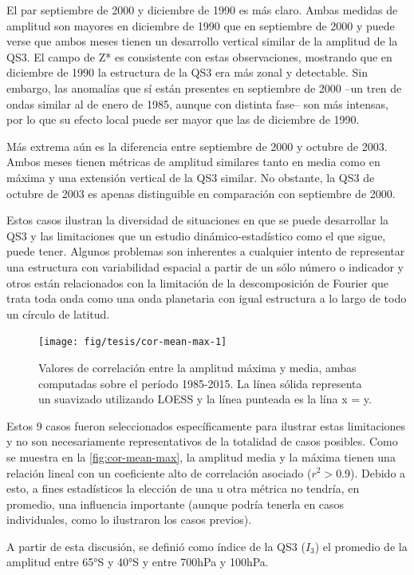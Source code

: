 \documentclass[spanish,a4paper,12pt,oneside]{book}
\begin{document}
El par septiembre de 2000 y diciembre de 1990 es más claro. Ambas
medidas de amplitud son mayores en diciembre de 1990 que en septiembre
de 2000 y puede verse que ambos meses tienen un desarrollo vertical
similar de la amplitud de la QS3. El campo de Z* es consistente con
estas observaciones, mostrando que en diciembre de 1990 la estructura de
la QS3 era más zonal y detectable. Sin embargo, las anomalías que sí
están presentes en septiembre de 2000 --un tren de ondas similar al de
enero de 1985, aunque con distinta fase-- son más intensas, por lo que
su efecto local puede ser mayor que las de diciembre de 1990.

Más extrema aún es la diferencia entre septiembre de 2000 y octubre de
2003. Ambos meses tienen métricas de amplitud similares tanto en media
como en máxima y una extensión vertical de la QS3 similar. No obstante,
la QS3 de octubre de 2003 es apenas distinguible en comparación con
septiembre de 2000.

Estos casos ilustran la diversidad de situaciones en que se puede
desarrollar la QS3 y las limitaciones que un estudio
dinámico-estadístico como el que sigue, puede tener. Algunos problemas
son inherentes a cualquier intento de representar una estructura con
variabilidad espacial a partir de un sólo número o indicador y otros
están relacionados con la limitación de la descomposición de Fourier que
trata toda onda como una onda planetaria con igual estructura a lo largo
de todo un círculo de latitud.

\begin{figure}
\texttt{[image: fig/tesis/cor-mean-max-1]} \caption{Valores de correlación entre la amplitud máxima y media, ambas computadas sobre el período 1985-2015. La línea sólida representa un suavizado utilizando LOESS y la línea punteada es la lína x = y.}\label{fig:cor-mean-max}
\end{figure}

Estos 9 casos fueron seleccionados específicamente para ilustrar estas
limitaciones y no son necesariamente representativos de la totalidad de
casos posibles. Como se muestra en la \autoref{fig:cor-mean-max}, la
amplitud media y la máxima tienen una relación lineal con un coeficiente
alto de correlación asociado (\(r^2>0.9\)). Debido a esto, a fines
estadísticos la elección de una u otra métrica no tendría, en promedio,
una influencia importante (aunque podría tenerla en casos individuales,
como lo ilustraron los casos previos).

A partir de esta discusión, se definió como índice de la QS3 (\(I_3\))
el promedio de la amplitud entre 65°S y 40°S y entre 700hPa y 100hPa.
\end{document}
